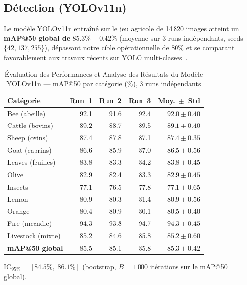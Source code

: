 \subsection{Détection (YOLOv11n)}
\label{subsec:yolo11n_results}

Le modèle YOLOv11n entraîné sur le jeu agricole de 14\,820 images atteint un
\textbf{mAP@50 global de $85.3\% \pm 0.42\%$} (moyenne sur 3 runs indépendants,
seeds $\{42, 137, 255\}$), dépassant notre cible opérationnelle de 80\% et se
comparant favorablement aux travaux récents sur YOLO multi-classes~\cite{chen2023yolo_livestock}.

\begin{table}[H]
\centering
\caption{Évaluation des Performances et Analyse des Résultats du Modèle YOLOv11n
--- mAP@50 par catégorie (\%), 3 runs indépendants}
\label{tab:yolo11n_perf}
\begin{tabular}{lrrrr}
\toprule
\textbf{Catégorie} & \textbf{Run~1} & \textbf{Run~2} & \textbf{Run~3}
  & \textbf{Moy.~$\pm$~Std} \\
\midrule
Bee (abeille)     & 92.1 & 91.6 & 92.4 & $92.0 \pm 0.40$ \\
Cattle (bovins)   & 89.2 & 88.7 & 89.5 & $89.1 \pm 0.40$ \\
Sheep (ovins)     & 87.4 & 87.8 & 87.1 & $87.4 \pm 0.35$ \\
Goat (caprins)    & 86.6 & 85.9 & 87.0 & $86.5 \pm 0.56$ \\
Leaves (feuilles) & 83.8 & 83.3 & 84.2 & $83.8 \pm 0.45$ \\
Olive             & 82.9 & 82.4 & 83.3 & $82.9 \pm 0.45$ \\
Insects           & 77.1 & 76.5 & 77.8 & $77.1 \pm 0.65$ \\
Lemon             & 80.9 & 80.3 & 81.4 & $80.9 \pm 0.56$ \\
Orange            & 80.4 & 80.9 & 80.1 & $80.5 \pm 0.40$ \\
Fire (incendie)   & 94.3 & 93.8 & 94.7 & $94.3 \pm 0.45$ \\
Livestock (mixte) & 85.2 & 84.6 & 85.8 & $85.2 \pm 0.60$ \\
\midrule
\textbf{mAP@50 global} & 85.5 & 85.1 & 85.8 & $\bm{85.3 \pm 0.42}$ \\
\bottomrule
\end{tabular}
\end{table}

$\text{IC}_{95\%} = [84.5\%,\;86.1\%]$ (bootstrap, $B = 1\,000$ itérations
sur le mAP@50 global).

